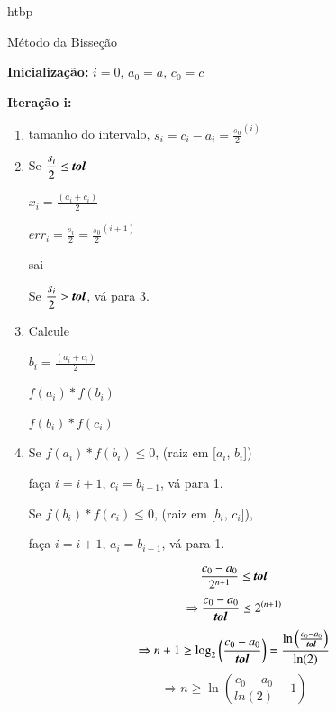 \begin{algorithm}{htbp}

  \caption{Método da Bisseção}

  \begin{algorithmic}
    \STATE \textbf{Inicialização:} $i=0$, $a_{0}=a$, $c_{0}=c$

    \STATE \textbf{Iteração i:}

    \begin{enumerate}
     \item tamanho do intervalo, $\displaystyle s_{i} = c_{i}-a_{i} = \frac{s_{0}}{2}^{(i)}$
     \item Se $ \displaystyle \frac{s_{i}}{2} \leq \textit{\textbf{tol}} $

      $ \displaystyle \textit{x}_{i} = \frac{(a_{i} + c_{i})}{2} $

      $ \displaystyle \textit{err}_{i} = \frac{s_{i}}{2} = {\frac{s_{0}}{2}}^{(i+1)} $

      sai

      Se $ \displaystyle \frac{s_{i}}{2} > \textit{\textbf{tol}} $, vá para 3.

      \item Calcule

      $ \displaystyle b_{i} = \frac{(a_{i} + c_{i})}{2} $

      $ f(a_{i}) \ast f(b_{i}) $

      $ f(b_{i}) \ast f(c_{i}) $

      \item Se $ f(a_{i}) \ast f(b_{i}) \leq 0 $, (raiz em [$a_{i}$, $b_{i}$])

      faça $i = i + 1$, $c_{i} = b_{i-1}$, vá para 1.

      Se $ f(b_{i}) \ast f(c_{i}) \leq 0 $, (raiz em [$b_{i}$, $c_{i}$]),

      faça $i = i + 1$, $a_{i} = b_{i-1}$, vá para 1.

    \end{enumerate}

  \end{algorithmic}

\end{algorithm}

\begin{displaymath}
 \frac{c_{0} - a_{0}}{2^{n+1}} \leq \textit{\textbf{tol}}
\end{displaymath}
\begin{displaymath}
 \Rightarrow \frac{c_{0} - a_{0}}{\textit{\textbf{tol}}} \leq 2^{(n+1)}
\end{displaymath}
\begin{displaymath}
 \Rightarrow n + 1 \geq \log_{2}\left( \frac{c_{0}-a_{0}}{\textit{\textbf{tol}}} \right)
 = \frac{ \ln \left( \frac{c_{0}-a_{0}}{\textit{\textbf{tol}}} \right) }{\ln(2)}
\end{displaymath}
\begin{displaymath}
 \Rightarrow n \geq \ln\left( \frac{c_{0}-a_{0}}{ln(2)} - 1 \right)
\end{displaymath}

